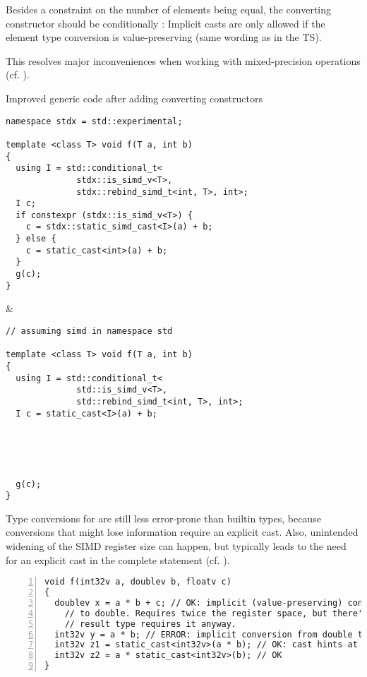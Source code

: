 Besides a constraint on the number of elements being equal, the converting
constructor should be conditionally :
Implicit casts are only allowed if the element type conversion is
value-preserving (same wording as in the TS).

This resolves major inconveniences when working with mixed-precision
operations (cf. ).
\begin{tonytable}[Parallelism TS 2]{Improved generic code after adding converting constructors}\label{tt:better with conv ctors}
  \begin{lstlisting}
namespace stdx = std::experimental;

template <class T> void f(T a, int b)
{
  using I = std::conditional_t<
              stdx::is_simd_v<T>,
              stdx::rebind_simd_t<int, T>, int>;
  I c;
  if constexpr (stdx::is_simd_v<T>) {
    c = stdx::static_simd_cast<I>(a) + b;
  } else {
    c = static_cast<int>(a) + b;
  }
  g(c);
}
  \end{lstlisting}
  &
  \begin{lstlisting}
// assuming simd in namespace std

template <class T> void f(T a, int b)
{
  using I = std::conditional_t<
              std::is_simd_v<T>,
              std::rebind_simd_t<int, T>, int>;
  I c = static_cast<I>(a) + b;





  g(c);
}
  \end{lstlisting}
\end{tonytable}%
Type conversions for  are still less error-prone than builtin types,
because conversions that might lose information require an explicit cast.
Also, unintended widening of the SIMD register size can happen, but typically
leads to the need for an explicit cast in the complete statement (cf.
).

\begin{lstlisting}[numbers=left,float={hbtp},label=lst:mixedprecision,caption={
  Mixed precision code using the types from \lst{lst:simdtypespattern}, ensuring equal element count
}]
void f(int32v a, doublev b, floatv c)
{
  doublev x = a * b + c; // OK: implicit (value-preserving) conversion from int and float
    // to double. Requires twice the register space, but there's no way around it and the
    // result type requires it anyway.
  int32v y = a * b; // ERROR: implicit conversion from double to int not value-preserving
  int32v z1 = static_cast<int32v>(a * b); // OK: cast hints at implicit register widening
  int32v z2 = a * static_cast<int32v>(b); // OK
}
\end{lstlisting}

